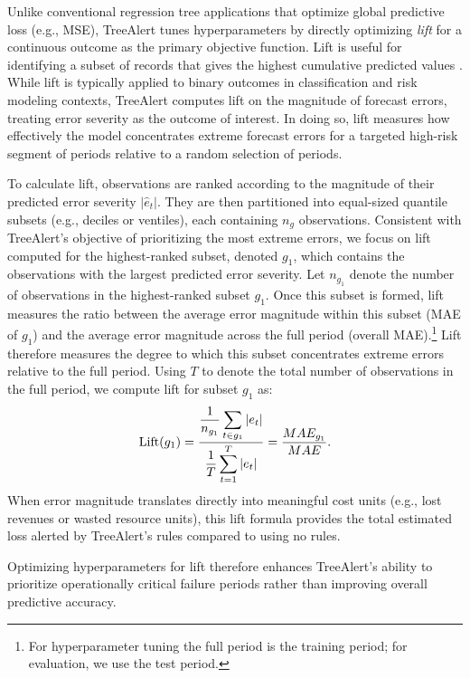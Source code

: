 \documentclass[12pt]{article}
\begin{document}
Unlike conventional regression tree applications that optimize global predictive loss (e.g., MSE), TreeAlert tunes hyperparameters by directly optimizing \emph{lift} for a continuous outcome as the primary objective function. Lift is useful for identifying a subset of records that gives the highest cumulative predicted values \citep{shmueli2024machine}. While lift is typically applied to binary outcomes  in classification and risk modeling contexts, TreeAlert computes lift on the magnitude of forecast errors, treating error severity as the outcome of interest. In doing so, lift measures how effectively the model concentrates extreme forecast errors for a targeted high-risk segment of periods relative to a random selection of periods. 

To calculate lift, observations are ranked according to the magnitude of their predicted error severity $|\hat{e}_t|$. They are then partitioned into equal-sized quantile subsets (e.g., deciles or ventiles), each containing \( n_g \) observations. Consistent with TreeAlert’s objective of prioritizing the most extreme errors, %
we focus on lift computed for the highest-ranked subset, denoted \( g_{1} \), which contains the observations with the largest predicted error severity. Let \( n_{g_1} \) denote the number of observations in the highest-ranked subset \( g_{1} \). Once this subset is formed, lift measures the ratio between the average error magnitude within this subset (MAE of $g_1$) and the average  error magnitude across the full %
period (overall MAE).\footnote{For hyperparameter tuning the full period is the training period; for evaluation, we use the test period.} Lift therefore measures the degree to which this subset concentrates extreme errors relative to the full %
period. Using \( T \) to denote the total number of observations in the full %
period, we compute lift for subset \( g_{1} \) as:
\begin{equation}
\text{Lift}(g_{1}) =
\frac{
\displaystyle \frac{1}{n_{g_1}}\sum_{t\in {g_1}} |e_t|
}{
\displaystyle \frac{1}{T}\sum_{t=1}^{T} |e_t|
} = \frac{MAE_{g_1}}{MAE}.
\end{equation}
When error magnitude translates directly into meaningful cost units (e.g., lost revenues or wasted resource units), this lift formula provides the total estimated loss alerted by TreeAlert's rules compared to using no rules. 

Optimizing hyperparameters for %
lift therefore enhances TreeAlert’s ability to prioritize operationally critical failure periods rather than improving overall predictive accuracy. %
\end{document}
